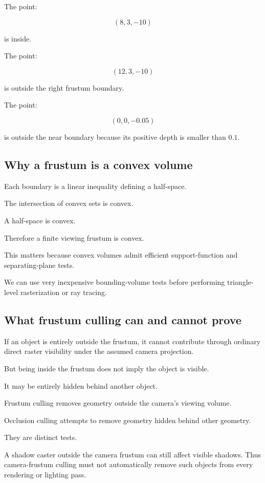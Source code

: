 The point:

\[
 (8,3,-10)
\]

is inside.

The point:

\[
 (12,3,-10)
\]

is outside the right frustum boundary.

The point:

\[
 (0,0,-0.05)
\]

is outside the near boundary because its positive depth is smaller than \(0.1\).

\subsection{Why a frustum is a convex volume}\label{02-foundations-ii-ch034-why-a-frustum-is-a-convex-volume}

Each boundary is a linear inequality defining a half-space.

The intersection of convex sets is convex.

A half-space is convex.

Therefore a finite viewing frustum is convex.

This matters because convex volumes admit efficient support-function and separating-plane tests.

We can use very inexpensive bounding-volume tests before performing triangle-level rasterization or ray tracing.

\subsection{What frustum culling can and cannot prove}\label{02-foundations-ii-ch034-what-frustum-culling-can-and-cannot-prove}

If an object is entirely outside the frustum, it cannot contribute through ordinary direct raster visibility under the assumed camera projection.

But being inside the frustum does not imply the object is visible.

It may be entirely hidden behind another object.

Frustum culling removes geometry outside the camera's viewing volume.

Occlusion culling attempts to remove geometry hidden behind other geometry.

They are distinct tests.

A shadow caster outside the camera frustum can still affect visible shadows. Thus camera-frustum culling must not automatically remove such objects from every rendering or lighting pass.

